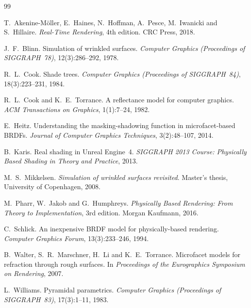 \begin{thebibliography}{99}

T.~Akenine-M\"oller, E.~Haines, N.~Hoffman, A.~Pesce, M.~Iwanicki and S.~Hillaire.
\emph{Real-Time Rendering}, 4th edition. CRC Press, 2018.

J.~F.~Blinn. Simulation of wrinkled surfaces.
\emph{Computer Graphics (Proceedings of SIGGRAPH~78)}, 12(3):286--292, 1978.

R.~L.~Cook. Shade trees.
\emph{Computer Graphics (Proceedings of SIGGRAPH~84)}, 18(3):223--231, 1984.

R.~L.~Cook and K.~E.~Torrance. A reflectance model for computer graphics.
\emph{ACM Transactions on Graphics}, 1(1):7--24, 1982.

E.~Heitz. Understanding the masking-shadowing function in microfacet-based BRDFs.
\emph{Journal of Computer Graphics Techniques}, 3(2):48--107, 2014.

B.~Karis. Real shading in Unreal Engine~4.
\emph{SIGGRAPH 2013 Course: Physically Based Shading in Theory and Practice}, 2013.

M.~S.~Mikkelsen. \emph{Simulation of wrinkled surfaces revisited}.
Master's thesis, University of Copenhagen, 2008.

M.~Pharr, W.~Jakob and G.~Humphreys.
\emph{Physically Based Rendering: From Theory to Implementation}, 3rd edition.
Morgan Kaufmann, 2016.

C.~Schlick. An inexpensive BRDF model for physically-based rendering.
\emph{Computer Graphics Forum}, 13(3):233--246, 1994.

B.~Walter, S.~R.~Marschner, H.~Li and K.~E.~Torrance.
Microfacet models for refraction through rough surfaces.
In \emph{Proceedings of the Eurographics Symposium on Rendering}, 2007.

L.~Williams. Pyramidal parametrics.
\emph{Computer Graphics (Proceedings of SIGGRAPH~83)}, 17(3):1--11, 1983.

\end{thebibliography}
